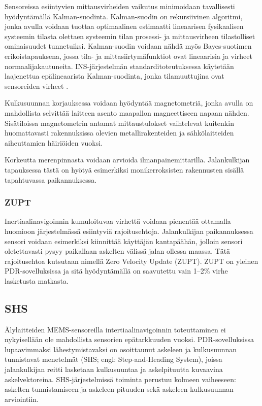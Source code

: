 Sensoreissa esiintyvien mittausvirheiden vaikutus minimoidaan tavallisesti
hyödyntämällä Kalman-suodinta.
Kalman-suodin on rekursiivinen algoritmi,
jonka avulla voidaan tuottaa optimaalinen estimaatti lineaarisen
fysikaalisen systeemin
tilasta olettaen systeemin tilan prosessi- ja mittausvirheen tilastolliset
ominaisuudet tunnetuiksi. Kalman-suodin voidaan nähdä myös Bayes-suotimen
erikoistapauksena,
jossa tila- ja mittasiirtymäfunktiot ovat lineaarisia ja virheet
normaalijakautuneita. INS-järjestelmän standarditoteutuksessa
käytetään laajenettua epälineaarista Kalman-suodinta, jonka tilamuuttujina
ovat sensoreiden virheet \cite{foxlin2005}.

Kulkusuunnan korjauksessa voidaan hyödyntää magnetometriä, jonka avulla on
mahdollista selvittää laitteen asento maapallon magneettiseen napaan nähden.
Sisätiloissa magnetometrin antamat mittaustulokset vaihtelevat kuitenkin
huomattavasti rakennuksissa olevien metallirakenteiden ja sähkölaitteiden
aiheuttamien häiriöiden vuoksi.

Korkeutta merenpinnasta voidaan arvioida ilmanpainemittarilla. Jalankulkijan
tapauksessa tästä on hyötyä esimerkiksi monikerroksisten rakennusten
sisällä tapahtuvassa paikannuksessa.

\subsubsection{ZUPT}

Inertiaalinavigoinnin kumuloituvaa virhettä voidaan pienentää ottamalla
huomioon järjestelmässä esiintyviä rajoitusehtoja. Jalankulkijan paikannuksessa
sensori voidaan esimerkiksi kiinnittää käyttäjän kantapäähän, jolloin
sensori oletettavasti pysyy paikallaan askelten välissä jalan ollessa maassa.
Tätä rajoitusehtoa kutsutaan nimellä Zero Velocity Update (ZUPT).
ZUPT on yleinen PDR-sovelluksissa ja sitä hyödyntämällä on saavutettu
vain 1--2\% virhe lasketusta matkasta.

\subsection{SHS}

Älylaitteiden MEMS-sensoreilla intertiaalinavigoinnin toteuttaminen ei
nykyisellään ole mahdollista sensorien epätarkkuuden vuoksi.  PDR-sovelluksissa
lupaavimmaksi lähestymistavaksi on osoittaunut askeleen ja kulkusuunnan
tunnistavat menetelmät (SHS; engl: Step-and-Heading System), joissa
jalankulkijan reitti lasketaan kulkusuuntaa ja askelpituutta kuvaavina
askelvektoreina. SHS-järjestelmissä toiminta perustuu kolmeen vaiheeseen:
askelten tunnistamiseen ja askeleen pituuden sekä askeleen kulkusuunnan
arviointiin.

